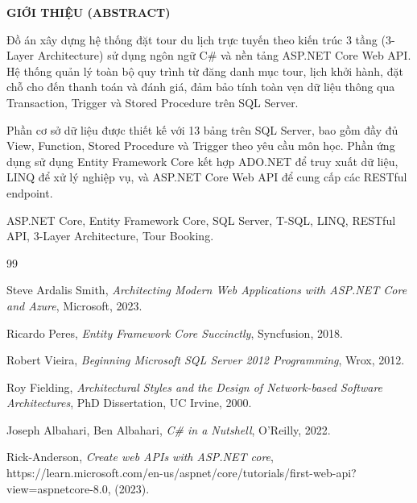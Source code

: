 \documentclass[12pt,a4paper,oneside]{book}
\theoremstyle{plain}
\numberwithin{equation}{chapter}
\begin{document}
\vspace{1.5cm}

\begin{center}
  \large{\textbf{GIỚI THIỆU (ABSTRACT)}}
\end{center}

Đồ án xây dựng hệ thống đặt tour du lịch trực tuyến theo kiến trúc 3 tầng
(3-Layer Architecture) sử dụng ngôn ngữ C\# và nền tảng ASP.NET Core Web API.
Hệ thống quản lý toàn bộ quy trình từ đăng danh mục tour, lịch khởi hành,
đặt chỗ cho đến thanh toán và đánh giá, đảm bảo tính toàn vẹn dữ liệu thông
qua Transaction, Trigger và Stored Procedure trên SQL Server.

Phần cơ sở dữ liệu được thiết kế với 13 bảng trên SQL Server, bao gồm đầy đủ
View, Function, Stored Procedure và Trigger theo yêu cầu môn học. Phần ứng dụng
sử dụng Entity Framework Core kết hợp ADO.NET để truy xuất dữ liệu, LINQ để
xử lý nghiệp vụ, và ASP.NET Core Web API để cung cấp các RESTful endpoint.

\vspace{0.5cm}
 ASP.NET Core, Entity Framework Core, SQL Server,
T-SQL, LINQ, RESTful API, 3-Layer Architecture, Tour Booking.

\newpage
\tableofcontents

\newpage
\listoffigures
{}

\newpage
\listoftables
{}

\newpage
{}






\newpage
\begin{thebibliography}{99}

 Steve Ardalis Smith,
  \textit{Architecting Modern Web Applications with ASP.NET Core and Azure},
  Microsoft, 2023.

 Ricardo Peres,
  \textit{Entity Framework Core Succinctly},
  Syncfusion, 2018.

 Robert Vieira,
  \textit{Beginning Microsoft SQL Server 2012 Programming},
  Wrox, 2012.

 Roy Fielding,
  \textit{Architectural Styles and the Design of Network-based Software Architectures},
  PhD Dissertation, UC Irvine, 2000.

 Joseph Albahari, Ben Albahari,
  \textit{C\# in a Nutshell},
  O'Reilly, 2022.

 Rick-Anderson,
  \textit{Create web APIs with ASP.NET core},
  https://learn.microsoft.com/en-us/aspnet/core/tutorials/first-web-api?view=aspnetcore-8.0,
  (2023).

\end{thebibliography}
\end{document}
